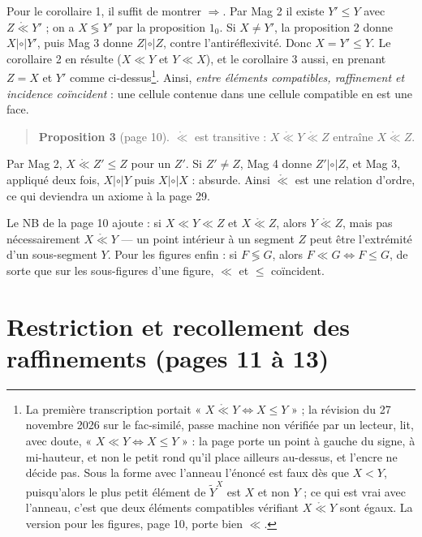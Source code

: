 \documentclass[11pt,a4paper]{article}
\begin{document}
Pour le corollaire 1, il suffit de montrer $\Rightarrow$. Par Mag 2 il existe
$Y' \leq Y$ avec $Z \mathrel{\mathring{\ll}} Y'$ ; on a $X \lessgtr Y'$ par la
proposition $1_{0}$. Si $X \neq Y'$, la proposition 2 donne $X
\mathrel{|\circ|} Y'$, puis Mag 3 donne $Z \mathrel{|\circ|} Z$, contre
l'antiréflexivité. Donc $X = Y' \leq Y$. Le corollaire 2 en résulte ($X \ll Y$
et $Y \ll X$), et le corollaire 3 aussi, en prenant $Z = X$ et $Y'$ comme
ci-dessus\footnote{La première transcription portait « $X
\mathrel{\mathring{\ll}} Y \iff X \leq Y$ » ; la révision du 27 novembre 2026
sur le fac-similé, passe machine non vérifiée par un lecteur, lit, avec doute,
« $X \ll Y \iff X \leq Y$ » : la page porte un point à gauche du signe, à
mi-hauteur, et non le petit rond qu'il place ailleurs au-dessus, et l'encre ne
décide pas. Sous la forme avec l'anneau l'énoncé est faux dès que $X < Y$, puisqu'alors le
plus petit élément de $\widetilde{Y}^{X}$ est $X$ et non $Y$ ; ce qui est vrai
avec l'anneau, c'est que deux éléments compatibles vérifiant $X
\mathrel{\mathring{\ll}} Y$ sont égaux. La version pour les figures, page 10,
porte bien $\ll$.}. Ainsi, \emph{entre éléments compatibles, raffinement et
incidence coïncident} : une cellule contenue dans une cellule compatible en est
une face.

\begin{quote}
\textbf{Proposition 3} (page 10). $\mathring{\ll}$ est transitive : $X
\mathrel{\mathring{\ll}} Y \mathrel{\mathring{\ll}} Z$ entraîne $X
\mathrel{\mathring{\ll}} Z$.
\end{quote}

Par Mag 2, $X \mathrel{\mathring{\ll}} Z' \leq Z$ pour un $Z'$. Si $Z' \neq Z$,
Mag 4 donne $Z' \mathrel{|\circ|} Z$, et Mag 3, appliqué deux fois, $X
\mathrel{|\circ|} Y$ puis $X \mathrel{|\circ|} X$ : absurde. Ainsi
$\mathring{\ll}$ est une relation d'ordre, ce qui deviendra un axiome à la page
29.

Le NB de la page 10 ajoute : si $X \ll Y \ll Z$ et $X \mathrel{\mathring{\ll}}
Z$, alors $Y \mathrel{\mathring{\ll}} Z$, mais pas nécessairement $X
\mathrel{\mathring{\ll}} Y$ --- un point intérieur à un segment $Z$ peut être
l'extrémité d'un sous-segment $Y$. Pour les figures enfin : si $F \lessgtr G$,
alors $F \ll G \iff F \leq G$, de sorte que sur les sous-figures d'une figure,
$\ll$ et $\leq$ coïncident.

\section*{Restriction et recollement des raffinements (pages 11 à 13)}
\end{document}
